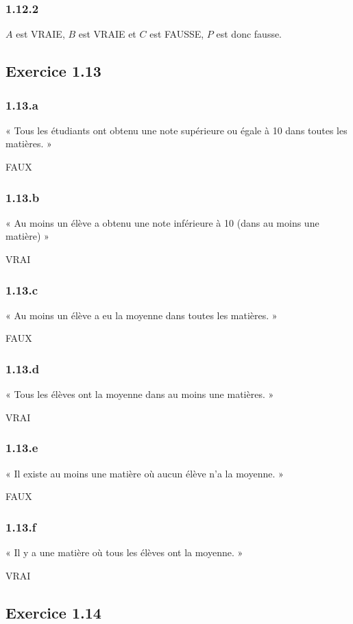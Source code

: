\documentclass[a4paper,10pt]{report}
\begin{document}
\subsubsection*{1.12.2}
$A$ est VRAIE, $B$ est VRAIE et $C$ est FAUSSE, $P$ est donc fausse.


\subsection*{Exercice 1.13}
\subsubsection*{1.13.a}
« Tous les étudiants ont obtenu une note supérieure ou égale à 10 dans toutes les matières. »

FAUX

\subsubsection*{1.13.b}
« Au moins un élève a obtenu une note inférieure à 10 (dans au moins une matière) »

VRAI

\subsubsection*{1.13.c}
« Au moins un élève a eu la moyenne dans toutes les matières. »

FAUX

\subsubsection*{1.13.d}
« Tous les élèves ont la moyenne dans au moins une matières. »

VRAI

\subsubsection*{1.13.e}
« Il existe au moins une matière où aucun élève n'a la moyenne. »

FAUX

\subsubsection*{1.13.f}
« Il y a une matière où tous les élèves ont la moyenne. »

VRAI


\subsection*{Exercice 1.14}
\end{document}
